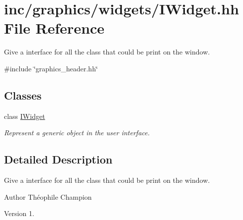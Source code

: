 \hypertarget{IWidget_8hh}{}\section{inc/graphics/widgets/\+I\+Widget.hh File Reference}
\label{IWidget_8hh}


Give a interface for all the class that could be print on the window.  


{\ttfamily \#include \char`\"{}graphics\+\_\+header.\+hh\char`\"{}}\newline
\subsection*{Classes}
\begin{DoxyCompactItemize}
\item 
class \hyperlink{classIWidget}{I\+Widget}
\begin{DoxyCompactList}\small\item\em Represent a generic object in the user interface. \end{DoxyCompactList}\end{DoxyCompactItemize}


\subsection{Detailed Description}
Give a interface for all the class that could be print on the window. 

\begin{DoxyAuthor}{Author}
Théophile Champion 
\end{DoxyAuthor}
\begin{DoxyVersion}{Version}
1. 
\end{DoxyVersion}
